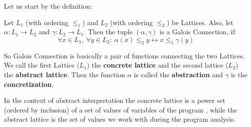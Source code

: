 Let us start by the definition:

\begin{defn}
    Let $L_1$ (with ordering $\leq _1$) and $L_2$ (with ordering $\leq _2$) be Lattices. %
    Also, let $\alpha: L_1 \rightarrow L_2$ and $\gamma: L_2 \rightarrow L_1$.
    Then the tuple $(\alpha, \gamma)$ is a Galois Connection, if:
    \[ \forall x \in L_1, \: \forall y \in L_2: \: \alpha(x) \leq_2 y \leftrightarrow x \leq_1 \gamma(y)\]
\end{defn}

So Galois Connection is basically a pair of functions connecting the two Lattices.
We call the first Lattice ($L_1$) the \textbf{concrete lattice} and the second lattice ($L_2$) the \textbf{abstract lattice}.
Then the function $\alpha$ is called the \textbf{abstraction} and $\gamma$ is the \textbf{concretization}.

In the context of abstract interpretation the concrete lattice is a power set (ordered by inclusion) of a set of values
of variables of the program , while the abstract lattice is the set of values we work with during the program analysis.

